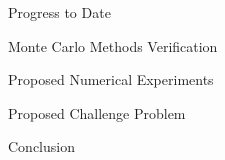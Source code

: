 \documentclass{beamer}
\begin{document}
\begin{frame}{Progress to Date}

\end{frame}

\begin{frame}{Monte Carlo Methods Verification}

\end{frame}

\begin{frame}{Proposed Numerical Experiments}

\end{frame}

\begin{frame}{Proposed Challenge Problem}

\end{frame}

\begin{frame}{Conclusion}

\end{frame}

\end{document}
